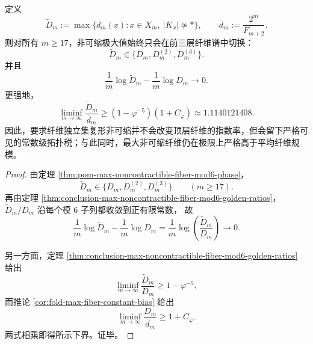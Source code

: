 \begin{corollary}[拓扑极大化与乘法极大化的三层闭包及常数量级税]\label{cor:conclusion-fiber-topological-maximization-threelevel-tax}
定义
\[
\widetilde D_m:=\max\{d_m(x):x\in X_m,\ |K_x|\not\simeq *\},
\qquad
\overline d_m:=\frac{2^m}{F_{m+2}}.
\]
则对所有 \(m\ge 17\)，非可缩极大值始终只会在前三层纤维谱中切换：
\[
\widetilde D_m\in\{D_m,D_m^{(2)},D_m^{(3)}\}.
\]
并且
\[
\frac{1}{m}\log \widetilde D_m-\frac{1}{m}\log D_m\longrightarrow 0.
\]
更强地，
\[
\liminf_{m\to\infty}\frac{\widetilde D_m}{\overline d_m}
\ge
(1-\varphi^{-5})(1+C_\varphi)
\approx
1.1140121408.
\]
因此，要求纤维独立集复形非可缩并不会改变顶层纤维的指数率，但会留下严格可见的常数级拓扑税；与此同时，最大非可缩纤维仍在极限上严格高于平均纤维规模。
\end{corollary}
\begin{proof}
由定理 \ref{thm:pom-max-noncontractible-fiber-mod6-phase}，
\[
\widetilde D_m\in\{D_m,D_m^{(2)},D_m^{(3)}\}
\qquad (m\ge 17).
\]
再由定理 \ref{thm:conclusion-max-noncontractible-fiber-mod6-golden-ratios}，
\(
\widetilde D_m/D_m
\)
沿每个模 \(6\) 子列都收敛到正有限常数，
故
\[
\frac{1}{m}\log \widetilde D_m-\frac{1}{m}\log D_m
=
\frac{1}{m}\log\!\left(\frac{\widetilde D_m}{D_m}\right)\to 0.
\]

另一方面，定理 \ref{thm:conclusion-max-noncontractible-fiber-mod6-golden-ratios} 给出
\[
\liminf_{m\to\infty}\frac{\widetilde D_m}{D_m}\ge 1-\varphi^{-5},
\]
而推论 \ref{cor:fold-max-fiber-constant-bias} 给出
\[
\liminf_{m\to\infty}\frac{D_m}{\overline d_m}\ge 1+C_\varphi.
\]
两式相乘即得所示下界。证毕。
\end{proof}


